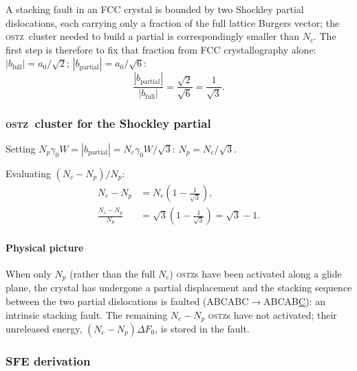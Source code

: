\documentclass[3p]{elsarticle}
\newcommand{\OSTZ}{\textsc{ostz}}
\newcommand{\dF}{\Delta F_0}
\newcommand{\gz}{\gamma_0}
\begin{document}
A stacking fault in an FCC crystal is bounded by two Shockley
partial dislocations, each carrying only a fraction of the full
lattice Burgers vector; the \OSTZ\ cluster needed to build a partial
is correspondingly smaller than $N_c$. The first step is therefore
to fix that fraction from FCC crystallography alone:
$|b_\text{full}|=a_0/\sqrt2$; $|b_\text{partial}|=a_0/\sqrt6$:
\begin{equation}
  \frac{|b_\text{partial}|}{|b_\text{full}|}
  =\frac{\sqrt2}{\sqrt6}=\frac{1}{\sqrt3}.
  \label{eq:bratio}
\end{equation}

\subsubsection{\OSTZ\ cluster for the Shockley partial}

Setting $N_p\gz W=|b_\text{partial}|=N_c\gz W/\sqrt3$:
$N_p=N_c/\sqrt3$.

Evaluating $(N_c-N_p)/N_p$:
\begin{align*}
  N_c-N_p&=N_c\!\left(1-\frac{1}{\sqrt3}\right),\\
  \frac{N_c-N_p}{N_p}&=\sqrt3\!\left(1-\frac{1}{\sqrt3}\right)=\sqrt3-1.
\end{align*}

\paragraph{Physical picture} When only $N_p$ (rather than the full
$N_c$) \OSTZ s have been activated along a glide plane, the crystal has
undergone a partial displacement and the stacking sequence between
the two partial dislocations is faulted
(ABCABC$\to$ABCAB\underline{C}): an intrinsic stacking fault. The
remaining $N_c-N_p$ \OSTZ s have not activated; their unreleased
energy, $(N_c-N_p)\dF$, is stored in the fault.

\subsubsection{SFE derivation}
\end{document}
